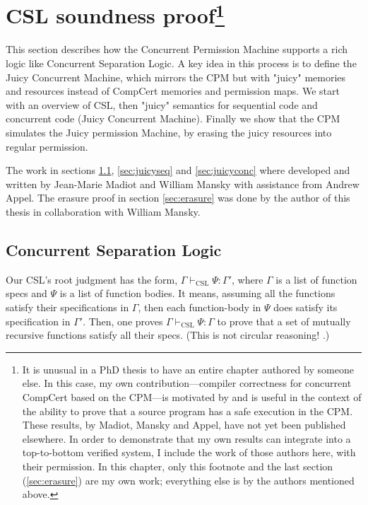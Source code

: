 \chapter[CSL soundness proof]{CSL soundness proof\footnote{It is unusual in a PhD thesis to have an entire chapter authored by someone else.  In this case, my own contribution---compiler correctness for concurrent CompCert based on the CPM---is motivated by and is useful in the context of the ability to prove that a source program has a safe execution in the CPM.  These results, by Madiot, Mansky and Appel, have not yet been published elsewhere.  In order to demonstrate that my own results can integrate into a top-to-bottom verified system, I include the work of those authors here, with their permission. In this chapter, only this footnote and the last section (\ref{sec:erasure}) are my own work; everything else is by the authors mentioned above.}}
\label{sec:CSLsound}

 

This section describes how the Concurrent Permission Machine supports a rich logic like Concurrent Separation Logic. 
A key idea in this process is to define the Juicy Concurrent Machine, which mirrors the CPM but with "juicy" memories and resources instead of CompCert memories and permission maps.
We start with an overview of CSL, then "juicy" semantics for sequential code and concurrent code (Juicy Concurrent Machine). Finally we show that the CPM simulates the Juicy permission Machine, by erasing the juicy resources into regular permission.

The work in sections \ref{sec:csl}, \ref{sec:juicyseq} and \ref{sec:juicyconc} where developed and written by Jean-Marie Madiot and William Mansky with assistance from Andrew Appel. The erasure proof in section \ref{sec:erasure} was done by the author of this thesis in collaboration with William Mansky.


\section{Concurrent Separation Logic}
\label{sec:csl}

Our CSL's root judgment has the form,
$\Gamma \vdash_\mathrm{CSL} \Psi:\Gamma'$,
where $\Gamma$ is a list of function specs
and $\Psi$ is a list of function bodies.
It means, assuming all the functions satisfy their specifications
in $\Gamma$, then each function-body in $\Psi$ does satisfy
its specification in $\Gamma'$.  Then, one proves
$\Gamma \vdash_\mathrm{CSL} \Psi:\Gamma$
to prove that a set of mutually recursive functions satisfy
all their specs.  (This is not circular reasoning!
\cite[Equation 81]{appel07:popl}.)

